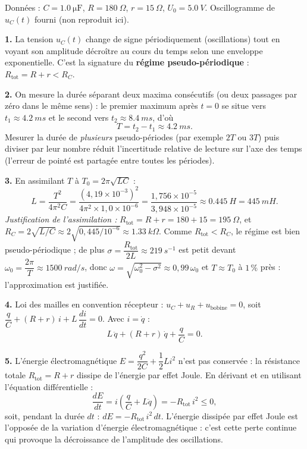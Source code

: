 \documentclass[11pt]{article}
\newcommand{\cle}[1]{{\popxbold\color{popdark}#1}}
\begin{document}
\begin{corrige}
Données : $C = \SI{1,0}{\micro\farad}$, $R = \SI{180}{\Omega}$, $r = \SI{15}{\Omega}$, $U_0 = \SI{5,0}{V}$. Oscillogramme de $u_C(t)$ fourni (non reproduit ici).

\textbf{1.} La tension $u_C(t)$ change de signe périodiquement (oscillations) tout en voyant son amplitude décroître au cours du temps selon une enveloppe exponentielle. C'est la signature du \textbf{régime pseudo-périodique} : $R_{\text{tot}} = R + r < R_C$.

\textbf{2.} On mesure la durée séparant deux maxima consécutifs (ou deux passages par zéro dans le même sens) : le premier maximum après $t = 0$ se situe vers $t_1 \approx \SI{4,2}{ms}$ et le second vers $t_2 \approx \SI{8,4}{ms}$, d'où
\[
T = t_2 - t_1 \approx \SI{4,2}{ms}.
\]
Mesurer la durée de \emph{plusieurs} pseudo-périodes (par exemple $2T$ ou $3T$) puis diviser par leur nombre réduit l'incertitude relative de lecture sur l'axe des temps (l'erreur de pointé est partagée entre toutes les périodes).

\textbf{3.} En assimilant $T$ à $T_0 = 2\pi\sqrt{LC}$ :
\[
L = \frac{T^2}{4\pi^2 C} = \frac{(4,19\times10^{-3})^2}{4\pi^2 \times 1,0\times10^{-6}} = \frac{1,756\times10^{-5}}{3,948\times10^{-5}} \approx \SI{0,445}{H} = \SI{445}{mH}.
\]
\textit{Justification de l'assimilation :} $R_{\text{tot}} = R + r = 180 + 15 = \SI{195}{\Omega}$, et $R_C = 2\sqrt{L/C} \approx 2\sqrt{0,445/10^{-6}} \approx \SI{1,33}{k\Omega}$. Comme $R_{\text{tot}} < R_C$, le régime est bien pseudo-périodique ; de plus $\sigma = \dfrac{R_{\text{tot}}}{2L} \approx \SI{219}{s^{-1}}$ est petit devant $\omega_0 = \dfrac{2\pi}{T} \approx \SI{1500}{rad/s}$, donc $\omega = \sqrt{\omega_0^2 - \sigma^2} \approx 0,99\,\omega_0$ et $T \approx T_0$ à $1\,\%$ près : l'approximation est justifiée.

\textbf{4.} Loi des mailles en convention récepteur : $u_C + u_R + u_{\text{bobine}} = 0$, soit $\dfrac{q}{C} + (R + r)\,i + L\,\dfrac{di}{dt} = 0$. Avec $i = \dot{q}$ :
\[
\boxed{L\,\ddot{q} + (R + r)\,\dot{q} + \frac{q}{C} = 0}.
\]

\textbf{5.} L'énergie électromagnétique $E = \dfrac{q^2}{2C} + \dfrac{1}{2}Li^2$ n'est pas conservée : la résistance totale $R_{\text{tot}} = R + r$ dissipe de l'énergie par \cle{effet Joule}. En dérivant et en utilisant l'équation différentielle :
\[
\frac{dE}{dt} = i\left(\frac{q}{C} + L\ddot{q}\right) = -R_{\text{tot}}\,i^2 \leq 0,
\]
soit, pendant la durée $dt$ : $\boxed{dE = -R_{\text{tot}}\,i^2\,dt}$. L'énergie dissipée par effet Joule est l'opposée de la variation d'énergie électromagnétique : c'est cette perte continue qui provoque la décroissance de l'amplitude des oscillations.


\end{corrige}
\end{document}
